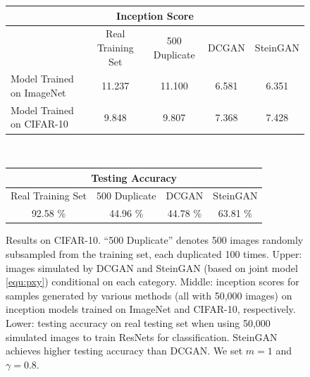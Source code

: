 \begin{figure}[t]
\begin{tabular}{|l|c|c|c|c|}
\hline
\multicolumn{5}{|c|}{Inception Score} \\
\hline
 & Real Training Set & 500 Duplicate  & DCGAN  & SteinGAN \\
\hline
Model Trained on ImageNet  & 11.237 & 11.100 & 6.581 & 6.351 \\ %
\hline
Model Trained on CIFAR-10 & 9.848 & 9.807 & 7.368  & 7.428 \\  %
\hline 
\end{tabular}  \\
\renewcommand{\arraystretch}{1.2}
\begin{tabular}{|c|c|c|c|}
\hline
\multicolumn{4}{|c|}{Testing Accuracy} \\
\hline
Real Training Set & 500 Duplicate  & DCGAN  & SteinGAN \\
\hline
92.58 \% &  44.96 \% & 44.78 \%  & 63.81 \%\\  %
\hline
\end{tabular}
\caption{Results on CIFAR-10. ``500 Duplicate'' denotes  500 images randomly subsampled from the training set, each duplicated 100 times.
Upper: images simulated by DCGAN and SteinGAN (based on joint model \eqref{equ:pxy}) conditional on each category.  
Middle: inception scores for samples generated by various methods (all with 50,000 images) on inception models trained on ImageNet and CIFAR-10, respectively. 
Lower: testing accuracy on real testing set when using 50,000 simulated images to train ResNets for classification. SteinGAN achieves higher testing accuracy than DCGAN. We set $m=1$ and $\gamma=0.8$.}%
\label{fig:cifar10}
\end{figure}



